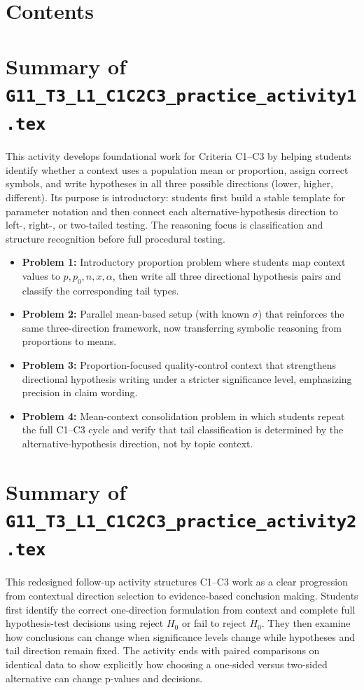 



\section*{Contents}
\setcounter{tocdepth}{2}
\setcounter{secnumdepth}{1}
\tableofcontents

\section{Summary of \texttt{G11\_T3\_L1\_C1C2C3\_practice\_activity1.tex}}
This activity develops foundational work for Criteria C1--C3 by helping students identify whether a context uses a population mean or proportion, assign correct symbols, and write hypotheses in all three possible directions (lower, higher, different). Its purpose is introductory: students first build a stable template for parameter notation and then connect each alternative-hypothesis direction to left-, right-, or two-tailed testing. The reasoning focus is classification and structure recognition before full procedural testing.

\begin{itemize}
    \item \textbf{Problem 1:} Introductory proportion problem where students map context values to \(p, p_0, n, x, \alpha\), then write all three directional hypothesis pairs and classify the corresponding tail types.
    \item \textbf{Problem 2:} Parallel mean-based setup (with known \(\sigma\)) that reinforces the same three-direction framework, now transferring symbolic reasoning from proportions to means.
    \item \textbf{Problem 3:} Proportion-focused quality-control context that strengthens directional hypothesis writing under a stricter significance level, emphasizing precision in claim wording.
    \item \textbf{Problem 4:} Mean-context consolidation problem in which students repeat the full C1--C3 cycle and verify that tail classification is determined by the alternative-hypothesis direction, not by topic context.
\end{itemize}

\section{Summary of \texttt{G11\_T3\_L1\_C1C2C3\_practice\_activity2.tex}}
This redesigned follow-up activity structures C1--C3 work as a clear progression from contextual direction selection to evidence-based conclusion making. Students first identify the correct one-direction formulation from context and complete full hypothesis-test decisions using reject \(H_0\) or fail to reject \(H_0\). They then examine how conclusions can change when significance levels change while hypotheses and tail direction remain fixed. The activity ends with paired comparisons on identical data to show explicitly how choosing a one-sided versus two-sided alternative can change p-values and decisions.

